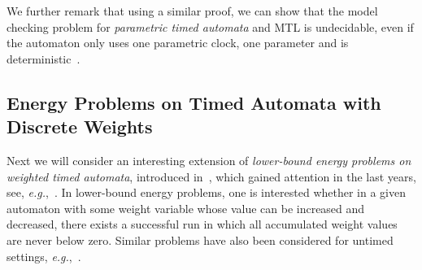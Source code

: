 \documentclass{CSML}
\theoremstyle{plain}\newtheorem{theorem}[thm]{Theorem}
\theoremstyle{plain}\newtheorem{corollary}[thm]{Corollary}
\theoremstyle{plain}\newtheorem{example}[thm]{Example}
\theoremstyle{plain}\newtheorem{lemma}[thm]{Lemma}
\theoremstyle{plain}\newtheorem{remark}[thm]{Remark}
\def\eg{{\em e.g.}}
\begin{document}
We further remark that using a similar proof, we can show that the model checking problem for \emph{parametric timed automata} and MTL is undecidable, even if the automaton only uses one parametric clock, one parameter and is deterministic~\cite{DBLP:journals/corr/Quaas14a}.


\subsection{Energy Problems on Timed Automata with Discrete Weights}
Next  we will consider an interesting extension of \emph{lower-bound energy problems on weighted timed automata}, introduced in~\cite{DBLP:conf/formats/BouyerFLMS08}, which gained  attention in the last years, see, \eg,~\cite{DBLP:journals/pe/BouyerLM14,DBLP:conf/lata/Quaas11,DBLP:conf/hybrid/BouyerFLM10}.
In lower-bound energy problems, 
one is interested whether in a given automaton with some weight variable whose value can be increased and decreased, there exists a successful run in which all accumulated weight values are never below zero.  
Similar problems have also been considered for untimed settings, \eg,~\cite{DBLP:conf/birthday/JuhlLR13,DBLP:conf/atva/EsikFLQ13,DBLP:conf/ictac/FahrenbergJLS11,DBLP:conf/icalp/BrazdilJK10}.  
\end{document}
